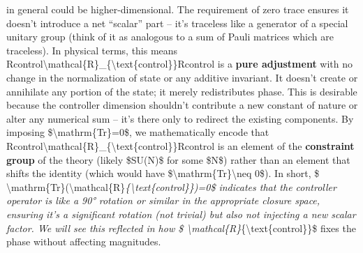 \documentclass[
]{article}
\begin{document}
in general could be higher-dimensional. The requirement of zero trace
ensures it doesn't introduce a net ``scalar'' part -- it's traceless
like a generator of a special unitary group (think of it as analogous to
a sum of Pauli matrices which are traceless). In physical terms, this
means
Rcontrol\textbackslash mathcal\{R\}\_\{\textbackslash text\{control\}\}Rcontrol\hspace{0pt}
is a \textbf{pure adjustment} with no change in the normalization of
state or any additive invariant. It doesn't create or annihilate any
portion of the state; it merely redistributes phase. This is desirable
because the controller dimension shouldn't contribute a new constant of
nature or alter any numerical sum -- it's there only to redirect the
existing components. By imposing \$\textbackslash mathrm\{Tr\}=0\$, we
mathematically encode that
Rcontrol\textbackslash mathcal\{R\}\_\{\textbackslash text\{control\}\}Rcontrol\hspace{0pt}
is an element of the \textbf{constraint group} of the theory (likely
\$SU(N)\$ for some \$N\$) rather than an element that shifts the
identity (which would have
\$\textbackslash mathrm\{Tr\}\textbackslash neq 0\$). In short, \$
\textbackslash mathrm\{Tr\}(\textbackslash mathcal\{R\}\emph{\{\textbackslash text\{control\}\})=0\$
indicates that the controller operator is like a 90° rotation or similar
in the appropriate closure space, ensuring it's a significant rotation
(not trivial) but also not injecting a new scalar factor. We will see
this reflected in how \$
\textbackslash mathcal\{R\}}\{\textbackslash text\{control\}\}\$ fixes
the phase without affecting magnitudes.
\end{document}
